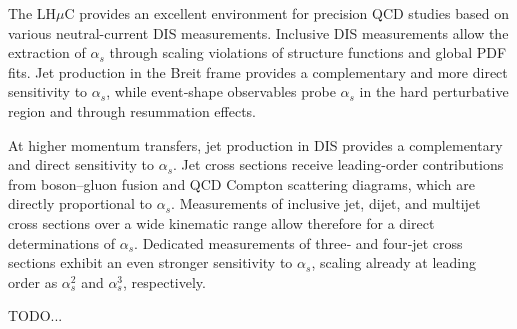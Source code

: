 \documentclass[a4paper,11pt]{article}
\newcommand{\lhuc}{LH\ensuremath{\mu}C\xspace}
\begin{document}
The \lhuc provides an excellent environment for precision QCD studies based on various neutral-current DIS measurements. Inclusive DIS measurements allow the extraction of
$\alpha_s$ through scaling violations of structure functions and global PDF fits. Jet production in the Breit frame provides a complementary and more direct sensitivity to
$\alpha_s$, while event‑shape observables probe
$\alpha_s$ in the hard perturbative region and through resummation effects.


At higher momentum transfers, jet production in DIS provides a complementary and direct sensitivity to $\alpha_s$. 
Jet cross sections receive leading-order contributions from boson–gluon fusion and QCD Compton scattering diagrams, which are directly proportional to $\alpha_s$. 
Measurements of inclusive jet, dijet, and multijet cross sections over a wide kinematic range allow therefore for a direct determinations of $\alpha_s$. 
Dedicated measurements of three‑ and four‑jet cross sections exhibit an even stronger sensitivity to
$\alpha_s$, scaling already at leading order as $\alpha_s^2$ and $\alpha_s^3$, respectively.

TODO...

\end{document}

